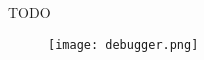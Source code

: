 TODO


\begin{figure}[h]
    \centering
    \texttt{[image: debugger.png]}
    \label{fig:debugger}
\end{figure}

